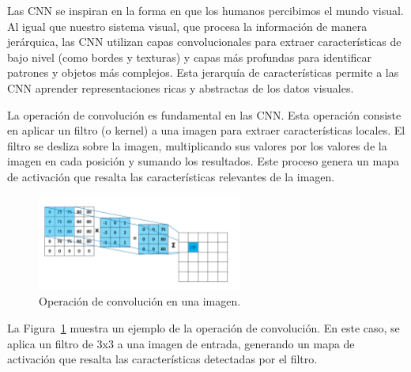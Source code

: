 \documentclass[11pt,spanish,listoffigures,listoftables]{tfgetsinf}
\begin{document}
Las CNN se inspiran en la forma en que los humanos percibimos el mundo visual. Al igual que nuestro sistema visual, que procesa la información de manera jerárquica, las CNN utilizan capas convolucionales para extraer características de bajo nivel (como bordes y texturas) y capas más profundas para identificar patrones y objetos más complejos. Esta jerarquía de características permite a las CNN aprender representaciones ricas y abstractas de los datos visuales.

La operación de convolución es fundamental en las CNN. Esta operación consiste en aplicar un filtro (o kernel) a una imagen para extraer características locales. El filtro se desliza sobre la imagen, multiplicando sus valores por los valores de la imagen en cada posición y sumando los resultados. Este proceso genera un mapa de activación que resalta las características relevantes de la imagen. 

\begin{figure}[H]
   \centering
   \includegraphics[width=0.6\textwidth]{images/estado_del_arte/operacion_convolucion.png}
   \caption{Operación de convolución en una imagen.}
   \label{fig:operacion_convolucion}
\end{figure}

La Figura~\ref{fig:operacion_convolucion} muestra un ejemplo de la operación de convolución. En este caso, se aplica un filtro de 3x3 a una imagen de entrada, generando un mapa de activación que resalta las características detectadas por el filtro.
\end{document}
